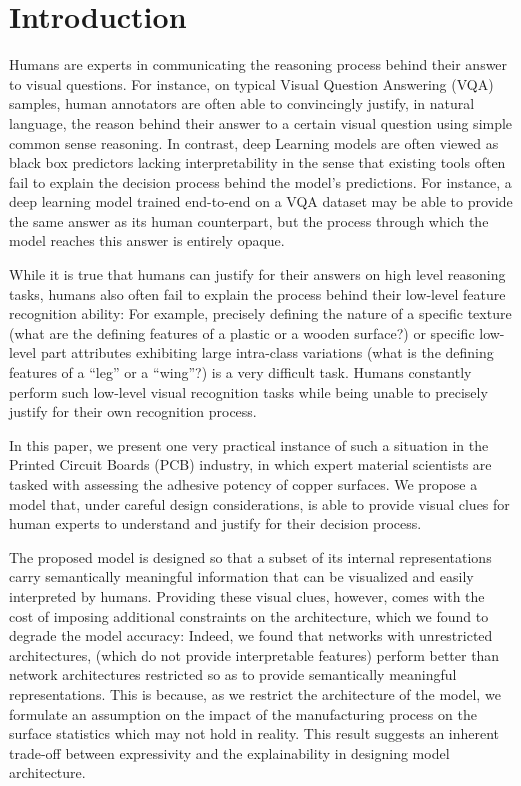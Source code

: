 \documentclass[10pt,twocolumn,letterpaper]{article}
\begin{document}
\section{Introduction}

Humans are experts in communicating the reasoning process behind their answer to visual questions.
For instance, on typical Visual Question Answering (VQA) samples, 
human annotators are often able to convincingly justify, in natural language, the reason 
behind their answer to a certain visual question using simple common sense reasoning.
In contrast, deep Learning models are often viewed as black box predictors lacking interpretability 
in the sense that existing tools often fail to explain the decision process behind the model’s predictions.
For instance, a deep learning model trained end-to-end on a VQA dataset may be able to provide the same answer as its
human counterpart, but the process through which the model reaches this answer is entirely opaque.

While it is true that humans can justify for their answers on high level reasoning tasks, 
humans also often fail to explain the process behind their low-level feature recognition ability:
For example, precisely defining the nature of a specific texture 
(what are the defining features of a plastic or a wooden surface?) 
or specific low-level part attributes exhibiting large intra-class variations 
(what is the defining features of a ``leg'' or a ``wing''?) is a very difficult task.
Humans constantly perform such low-level visual recognition tasks 
while being unable to precisely justify for their own recognition process.
	
In this paper, we present one very practical instance of such a situation in the Printed Circuit Boards (PCB) industry, 
in which expert material scientists are tasked with assessing the adhesive potency of copper surfaces.
We propose a model that, under careful design considerations, is able to provide visual clues 
for human experts to understand and justify for their decision process.
	
The proposed model is designed so that a subset of its internal representations carry semantically meaningful 
information that can be visualized and easily interpreted by humans.
Providing these visual clues, however, comes with the cost of imposing additional constraints on the architecture,
which we found to degrade the model accuracy:
Indeed, we found that networks with unrestricted architectures, 
(which do not provide interpretable features)
perform better than network architectures restricted so as to provide 
semantically meaningful representations.
This is because, as we restrict the architecture of the model, 
we formulate an assumption on the impact of the manufacturing process 
on the surface statistics which may not hold in reality.
This result suggests an inherent trade-off between  
expressivity and the explainability in designing model architecture.
	
\end{document}
